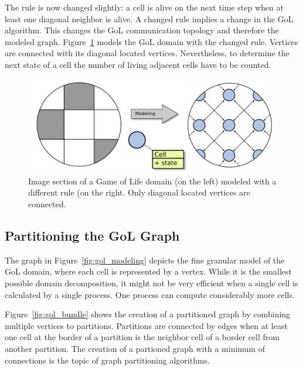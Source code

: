 \noindent The rule is now changed slightly: a cell is alive on the next time
step when at least one diagonal neighbor is alive.  A changed rule
 implies a change in the GoL algorithm.  This changes the GoL
communication topology and therefore the modeled
graph. Figure~\ref{fig:gol_modeling_changed} models the GoL domain
with the changed rule. Vertices are connected with its diagonal
located vertices. Nevertheless, to determine the next state of a cell
the number of living adjacent cells have to be counted.

\begin{figure}[H]
  \centering \includegraphics[width=\textwidth]{graphics/30_gol_modeling_changed}
  \caption{Image section of a Game of Life domain (on the left)
    modeled with a different rule (on the right. Only diagonal located
    vertices are connected.}
  \label{fig:gol_modeling_changed}
\end{figure}


\subsection{Partitioning the GoL Graph}
The graph in Figure~\ref{fig:gol_modeling} depicts the fine granular
model of the GoL domain, where each cell is represented by a vertex.
While it is the smallest possible domain decomposition, it might not
be very efficient when a single cell is calculated by a single
process. One process can compute considerably more cells.

Figure~\ref{fig:gol_bundle} shows the creation of a partitioned graph
by combining multiple vertices to partitions. Partitions are connected by edges when at least one cell at
the border of a partition is the neighbor cell of a border cell from
another partition.  The creation of a partioned graph  with a
minimum of connections is the topic of graph partitioning algorithms.

